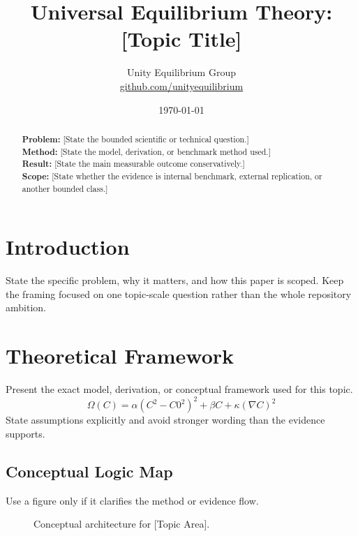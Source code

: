 \documentclass[11pt,a4paper,oneside]{article}
\title{\textbf{Universal Equilibrium Theory: [Topic Title]}}
\author{Unity Equilibrium Group \\ \small \href{https://github.com/unityequilibrium}{github.com/unityequilibrium}}
\date{\today}
\begin{document}
\maketitle

\begin{abstract}
\textbf{Problem:} [State the bounded scientific or technical question.] \\
\textbf{Method:} [State the model, derivation, or benchmark method used.] \\
\textbf{Result:} [State the main measurable outcome conservatively.] \\
\textbf{Scope:} [State whether the evidence is internal benchmark, external replication, or another bounded class.]
\end{abstract}

\section{Introduction}
State the specific problem, why it matters, and how this paper is scoped. Keep the framing
focused on one topic-scale question rather than the whole repository ambition.

\section{Theoretical Framework}
Present the exact model, derivation, or conceptual framework used for this topic.
\begin{equation}
    \Omega(C) = \alpha(C^2 - C0^2)^2 + \beta C + \kappa (\nabla C)^2
\end{equation}
State assumptions explicitly and avoid stronger wording than the evidence supports.

\subsection{Conceptual Logic Map}
Use a figure only if it clarifies the method or evidence flow.

\begin{figure}[h]
    \centering
    \caption{Conceptual architecture for [Topic Area].}
\end{figure}
\end{document}
